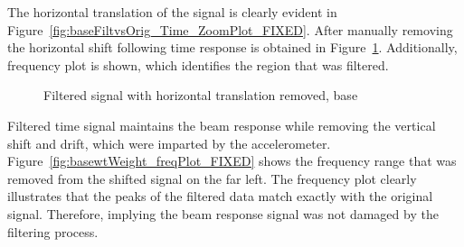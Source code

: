 \documentclass[paper=a4, fontsize=12pt]{scrartcl} %
\begin{document}
%
The horizontal translation of the signal is clearly evident in Figure~\ref{fig:baseFiltvsOrig_Time_ZoomPlot_FIXED}. After manually removing the horizontal shift following time response is obtained in Figure~\ref{fig:ShiftoutputSigFilterBase}. Additionally, frequency plot is shown, which identifies the region that was filtered.
%
	\begin{figure}[H]
		\centering
		\quad
		\caption{Filtered signal with horizontal translation removed, base}
		\label{fig:ShiftoutputSigFilterBase}
	\end{figure}
%
Filtered time signal maintains the beam response while removing the vertical shift and drift, which were imparted by the accelerometer. Figure~\ref{fig:basewtWeight_freqPlot_FIXED} shows the frequency range that was removed from the shifted signal on the far left. The frequency plot clearly illustrates that the peaks of the filtered data match exactly with the original signal. Therefore, implying the beam response signal was not damaged by the filtering process.
\\
\\
\end{document}
